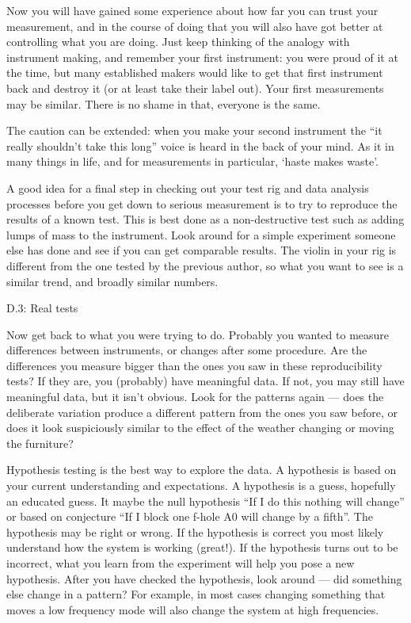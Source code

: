   Now you will have gained some experience about how far you can trust your 
  measurement, and in the course of doing that you will also have got better at 
  controlling what you are doing. Just keep thinking of the analogy with 
  instrument making, and remember your first instrument: you were proud of it 
  at the time, but many established makers would like to get that first 
  instrument back and destroy it (or at least take their label out). Your first 
  measurements may be similar. There is no shame in that, everyone is the same. 

  The caution can be extended: when you make your second instrument the “it 
  really shouldn’t take this long” voice is heard in the back of your mind. As 
  it in many things in life, and for measurements in particular, ‘haste makes 
  waste’. 

  A good idea for a final step in checking out your test rig and data analysis 
  processes before you get down to serious measurement is to try to reproduce 
  the results of a known test. This is best done as a non-destructive test such 
  as adding lumps of mass to the instrument. Look around for a simple 
  experiment someone else has done and see if you can get comparable results. 
  The violin in your rig is different from the one tested by the previous 
  author, so what you want to see is a similar trend, and broadly similar 
  numbers. 

  D.3: Real tests 

  Now get back to what you were trying to do. Probably you wanted to measure 
  differences between instruments, or changes after some procedure. Are the 
  differences you measure bigger than the ones you saw in these reproducibility 
  tests? If they are, you (probably) have meaningful data. If not, you may 
  still have meaningful data, but it isn’t obvious. Look for the patterns again 
  — does the deliberate variation produce a different pattern from the ones you 
  saw before, or does it look suspiciously similar to the effect of the weather 
  changing or moving the furniture? 

  Hypothesis testing is the best way to explore the data. A hypothesis is based 
  on your current understanding and expectations. A hypothesis is a guess, 
  hopefully an educated guess. It maybe the null hypothesis “If I do this 
  nothing will change” or based on conjecture “If I block one f-hole A0 will 
  change by a fifth”. The hypothesis may be right or wrong. If the hypothesis 
  is correct you most likely understand how the system is working (great!). If 
  the hypothesis turns out to be incorrect, what you learn from the experiment 
  will help you pose a new hypothesis. After you have checked the hypothesis, 
  look around — did something else change in a pattern? For example, in most 
  cases changing something that moves a low frequency mode will also change the 
  system at high frequencies. 

